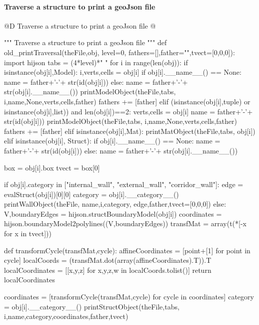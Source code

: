 \documentclass[11pt,oneside]{article}    %
\begin{document}
\paragraph{Traverse a structure to print a geoJson file}

@D Traverse a structure to print a geoJson file
@{""" Traverse a structure to print a geoJson file """
def old_printTraversal(theFile,obj, level=0, fathers=[],father="",tvect=[0,0,0]):
   import hijson
   tabs = (4*level)*" "
   for i in range(len(obj)):
      if isinstance(obj[i],Model): 
         i,verts,cells = obj[i]
         if obj[i].__name__() == None:
            name = father+'-'+ str(id(obj[i]))
         else: 
            name = father+'-'+ str(obj[i].__name__())
         printModelObject(theFile,tabs, i,name,None,verts,cells,father)
         fathers += [father]
      elif (isinstance(obj[i],tuple) or isinstance(obj[i],list)) and len(obj[i])==2:
         verts,cells = obj[i]
         name = father+'-'+ str(id(obj[i]))
         printModelObject(theFile,tabs, i,name,None,verts,cells,father)
         fathers += [father]
      elif isinstance(obj[i],Mat): 
         printMatObject(theFile,tabs, obj[i])
      elif isinstance(obj[i], Struct):
         if obj[i].__name__() == None:
            name = father+'-'+ str(id(obj[i]))
         else: 
            name = father+'-'+ str(obj[i].__name__())
            
         box = obj[i].box
         tvect = box[0]
         
         if obj[i].category in ["internal_wall", "external_wall", "corridor_wall"]:
             edge = evalStruct(obj[i])[0][0]
             category = obj[i].__category__()
             printWallObject(theFile, name,i,category, edge,father,tvect=[0,0,0])
         else:        
             V,boundaryEdges = hijson.structBoundaryModel(obj[i])   
             coordinates = hijson.boundaryModel2polylines((V,boundaryEdges))
             transfMat = array(t(*[-x for x in tvect]))
             
             def transformCycle(transfMat,cycle):
                 affineCoordinates = [point+[1] for point in cycle]
                 localCoords = (transfMat.dot(array(affineCoordinates).T)).T
                 localCoordinates = [[x,y,z] for x,y,z,w in localCoords.tolist()]
                 return localCoordinates
                 
             coordinates = [transformCycle(transfMat,cycle) for cycle in coordinates]
             category = obj[i].__category__()
             printStructObject(theFile,tabs, i,name,category,coordinates,father,tvect)
             
}
\end{document}
